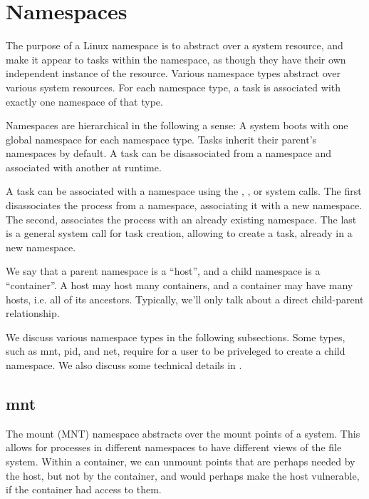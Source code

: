 
\section{Namespaces}

\label{section:sandboxing:namespaces}

The purpose of a Linux namespace is to abstract over a system resource, and
make it appear to tasks within the namespace, as though they have their own
independent instance of the resource. Various namespace types abstract over
various system resources. For each namespace type, a task is associated with
exactly one namespace of that type.

Namespaces are hierarchical in the following a sense: A system boots with one
global namespace for each namespace type.  Tasks inherit their parent's
namespaces by default. A task can be disassociated from a namespace and
associated with another at runtime.

A task can be associated with a namespace using the \cite{man-2-unshare},
\cite{man-2-setns}, or \cite{man-2-clone} system calls.  The first
disassociates the process from a namespace, associating it with a new
namespace. The second, associates the process with an already existing
namespace. The last is a general system call for task creation, allowing to
create a task, already in a new namespace.

We say that a parent namespace is a ``host'', and a child namespace is a
``container''. A host may host many containers, and a container may have many
hosts, i.e. all of its ancestors. Typically, we'll only talk about a direct
child-parent relationship.

We discuss various namespace types in the following subsections. Some types,
such as mnt, pid, and net, require for a user to be priveleged to create a
child namespace. We also discuss some technical details in
.

\subsection{mnt}

The mount (MNT) namespace abstracts over the mount points of a system. This
allows for processes in different namespaces to have different views of the
file system. Within a container, we can unmount points that are perhaps needed
by the host, but not by the container, and would perhaps make the host
vulnerable, if the container had access to them.

